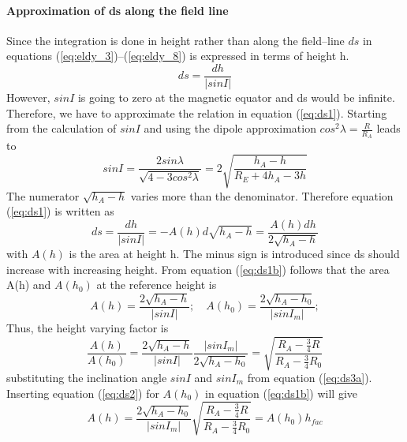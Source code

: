 \paragraph{Approximation of ds along the field line}
%
Since the integration is done in height rather than along the field--line
$ds$ in equations (\ref{eq:eldy_3})--(\ref{eq:eldy_8}) is expressed in terms of height h.
%
\begin{equation}
   ds =  \frac{dh}{|sin I|}\label{eq:ds1}
\end{equation}
%
However, $sin I$ is going to zero at the magnetic equator and ds would be infinite.
Therefore, we have to approximate the relation in equation (\ref{eq:ds1}). 
Starting from the calculation
of $sin I$ and using the dipole approximation $cos^2 \lambda = \frac{R}{R_A}$ leads to
%
\begin{equation}
   sin I  = \frac{2 sin \lambda}{\sqrt{4-3cos^2 \lambda}} = 
            2 \sqrt{\frac{ h_A - h}{R_E + 4 h_A - 3h}} \label{eq:ds3a}
\end{equation}
%
The numerator $\sqrt{ h_A - h}$ varies more than the denominator. Therefore equation 
(\ref{eq:ds1}) is written as
%
\begin{equation}
   ds  = \frac{dh}{|sin I|} = -A(h) d \sqrt{h_A-h} = 
         \frac{A(h) dh}{2 \sqrt{h_A-h}}\label{eq:ds1b}
\end{equation}
%
with $A(h)$ is the area at height h.
The minus sign is introduced since ds should increase with increasing height.
From equation (\ref{eq:ds1b}) follows that the area A(h) and $A(h_0)$ at the reference height is
%
\begin{equation}
   A(h)   = \frac{2 \sqrt{h_A-h}}{|sin I|};  \quad
   A(h_0) = \frac{2 \sqrt{h_A-h_0}}{|sin I_m|};  \label{eq:ds2}
\end{equation}
%
Thus, the height varying factor is
%
\begin{equation}
   \frac{A(h)}{A(h_0)}   = \frac{2 \sqrt{h_A-h}}{|sin I|} \frac{|sin I_m|}{2 \sqrt{h_A-h_0}} =
    \sqrt{\frac{R_A - \frac{3}{4} R}{R_A - \frac{3}{4} R_0}} \label{eq:ds3b}
\end{equation}
%
substituting the inclination angle $sin I$ and $sin I_m$ from equation (\ref{eq:ds3a}).
Inserting equation (\ref{eq:ds2}) for $A(h_0)$ in equation (\ref{eq:ds1b}) will
give 
%
\begin{equation}
     {A(h)}   = \frac{2 \sqrt{h_A-h_0}}{|sin I_m|}
     \sqrt{\frac{R_A - \frac{3}{4} R}{R_A - \frac{3}{4} R_0}} = A(h_0) h_{fac} \label{eq:ds7}
\end{equation}
